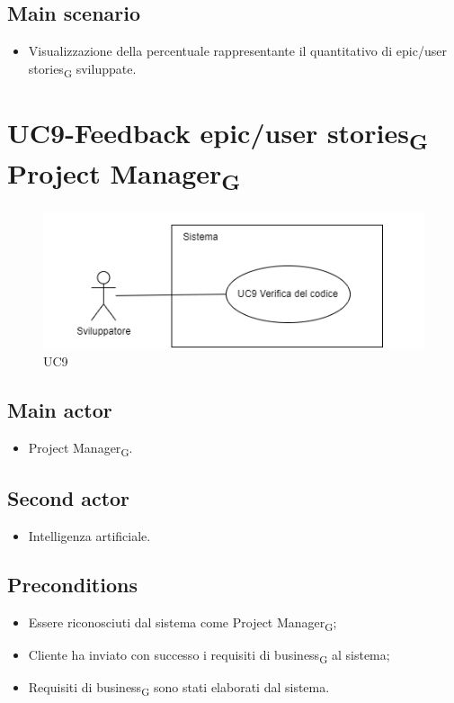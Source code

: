 \documentclass{article}
\begin{document}
    \subsection*{Main scenario}
        
        \begin{itemize}
            \item Visualizzazione della percentuale rappresentante il quantitativo di epic/user stories\textsubscript{G} sviluppate.
        \end{itemize}
        

\section{UC9-Feedback epic/user stories\textsubscript{G} Project Manager\textsubscript{G}}
    \begin{figure}[h]
      \centering
      \includegraphics{./imgUML/UC9.png}
    \caption{UC9}      
      \label{fig:UC9}
    \end{figure}
    \subsection*{Main actor}
    \begin{itemize}
        \item Project Manager\textsubscript{G}.
    \end{itemize}
    \subsection{Second actor}
    \begin{itemize}
        \item Intelligenza artificiale.
    \end{itemize}
    
    \subsection*{Preconditions}
        \begin{itemize}
            \item Essere riconosciuti dal sistema come Project Manager\textsubscript{G};
            \item Cliente ha inviato con successo i requisiti di business\textsubscript{G} al sistema;
            \item Requisiti di business\textsubscript{G} sono stati elaborati dal sistema.
        \end{itemize}
        
\end{document}
